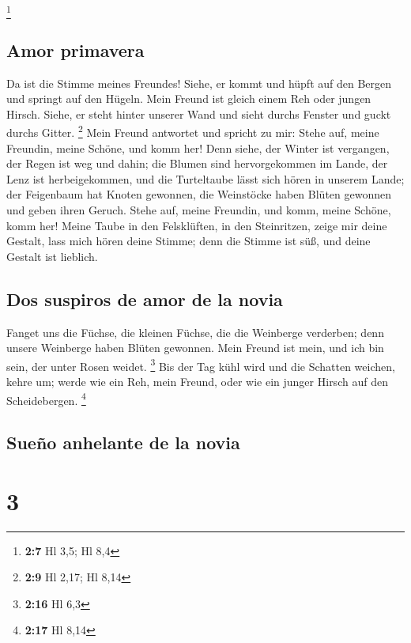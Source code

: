 \footnote{\textbf{2:7} Hl 3,5; Hl 8,4}

\hypertarget{amor-primavera}{%
\subsection{Amor primavera}\label{amor-primavera}}

 Da ist die Stimme meines Freundes! Siehe, er kommt und
hüpft auf den Bergen und springt auf den Hügeln.  Mein
Freund ist gleich einem Reh oder jungen Hirsch. Siehe, er steht hinter
unserer Wand und sieht durchs Fenster und guckt durchs Gitter.
\footnote{\textbf{2:9} Hl 2,17; Hl 8,14}  Mein Freund
antwortet und spricht zu mir: Stehe auf, meine Freundin, meine Schöne,
und komm her!  Denn siehe, der Winter ist vergangen, der
Regen ist weg und dahin;  die Blumen sind hervorgekommen
im Lande, der Lenz ist herbeigekommen, und die Turteltaube lässt sich
hören in unserem Lande;  der Feigenbaum hat Knoten
gewonnen, die Weinstöcke haben Blüten gewonnen und geben ihren Geruch.
Stehe auf, meine Freundin, und komm, meine Schöne, komm her!
 Meine Taube in den Felsklüften, in den Steinritzen,
zeige mir deine Gestalt, lass mich hören deine Stimme; denn die Stimme
ist süß, und deine Gestalt ist lieblich.

\hypertarget{dos-suspiros-de-amor-de-la-novia}{%
\subsection{Dos suspiros de amor de la
novia}\label{dos-suspiros-de-amor-de-la-novia}}

 Fanget uns die Füchse, die kleinen Füchse, die die
Weinberge verderben; denn unsere Weinberge haben Blüten gewonnen.
 Mein Freund ist mein, und ich bin sein, der unter Rosen
weidet. \footnote{\textbf{2:16} Hl 6,3}  Bis der Tag kühl
wird und die Schatten weichen, kehre um; werde wie ein Reh, mein Freund,
oder wie ein junger Hirsch auf den Scheidebergen. \footnote{\textbf{2:17}
  Hl 8,14}

\hypertarget{sueuxf1o-anhelante-de-la-novia}{%
\subsection{Sueño anhelante de la
novia}\label{sueuxf1o-anhelante-de-la-novia}}

\hypertarget{section-2}{%
\section{3}\label{section-2}}

